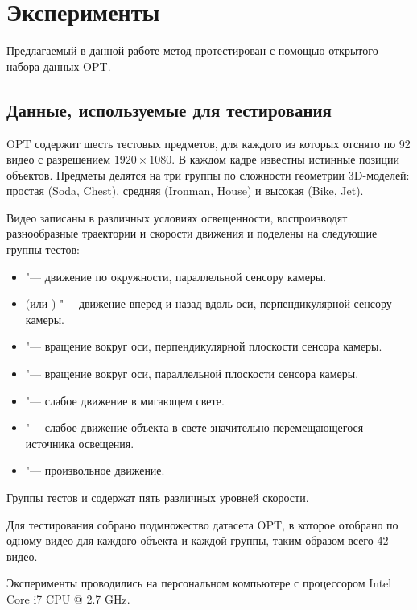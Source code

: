 \section{Эксперименты}\label{experiments}

Предлагаемый в данной работе метод протестирован с помощью открытого набора
данных OPT\cite{OPT}.

\subsection{Данные, используемые для тестирования}

OPT содержит шесть тестовых предметов, для каждого из которых отснято
по 92 видео с разрешением $1920\times1080$.
В каждом кадре известны истинные позиции объектов.
Предметы делятся на три группы по сложности геометрии 3D-моделей: простая
(Soda, Chest), средняя (Ironman, House) и высокая (Bike, Jet).

Видео записаны в различных условиях освещенности, воспроизводят разнообразные
траектории и скорости движения и поделены на следующие группы тестов:
\begin{itemize}
    \item {} "--- движение по окружности, параллельной
        сенсору камеры.
    \item {} (или ) "--- движение вперед и
        назад вдоль оси, перпендикулярной сенсору камеры.
    \item {} "--- вращение вокруг оси, перпендикулярной
        плоскости сенсора камеры.
    \item {} "--- вращение вокруг оси, параллельной
        плоскости сенсора камеры.
    \item {} "--- слабое движение в мигающем свете.
    \item {} "--- слабое движение объекта в свете значительно
        перемещающегося источника освещения.
    \item {} "--- произвольное движение.
\end{itemize}
Группы тестов  и  содержат пять различных
уровней скорости.

Для тестирования собрано подмножество датасета OPT, в которое отобрано по
одному видео для каждого объекта и каждой группы, таким образом всего 42 видео. 

Эксперименты проводились на персональном компьютере с процессором Intel Core i7
CPU @ 2.7 GHz.

